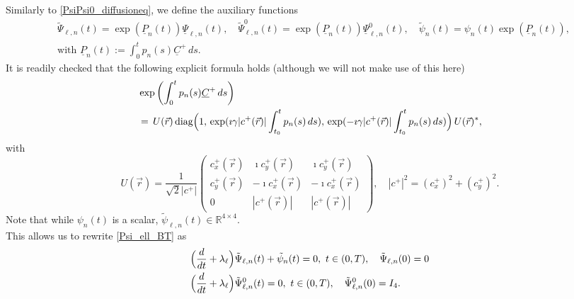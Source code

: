 \documentclass[12pt]{article}
\newcommand\ulC{\underline{C}}
\newcommand\ulPsi{\underline{\Psi}}
\begin{document}
Similarly to \eqref{PsiPsi0_diffusioneq}, we define the auxiliary functions 
\[
\begin{aligned}
&\tilde{\Psi}_{\ell,n}(t)=\exp(\underline{P}_n(t))\ulPsi_{\ell,n}(t), \quad
\tilde{\Psi}_{\ell,n}^0(t)=\exp(\underline{P}_n(t))\ulPsi_{\ell,n}^0(t),\quad
\tilde{\psi}_{n}(t)=\psi_n(t)\exp(\underline{P}_n(t)), \\
&\text{with }\underline{P}_n(t):=\int_0^tp_n(s)\ulC^+\, ds.
\end{aligned}
\]
It is readily checked that the following explicit formula holds (although we will not make use of this here) 
\begin{equation}\label{explicitsolution_BT_DII_A}
\begin{aligned}
&\exp\left(\int_0^tp_n(s)\ulC^+\, ds\right)\\
&=\,U(\vec r)\,\text{diag}\Bigl(1,\,\exp(\imath\gamma|c^+(\vec r)|\int_{t_0}^tp_n(s)\, ds),\,\exp(-\imath\gamma|c^+(\vec r)|\int_{t_0}^tp_n(s)\, ds)\Bigr)\,U(\vec r)^*,
\end{aligned}
\end{equation}
with 
\[
U(\vec r)= \frac{1}{\sqrt{2}|c^+|}\left(\begin{matrix}
c_x^+(\vec r)&\imath c_y^+(\vec r)&\imath c_y^+(\vec r)\\
c_y^+(\vec r)&-\imath c_x^+(\vec r)&-\imath c_x^+(\vec r)\\
0&|c^+(\vec r)|&|c^+(\vec r)|
\end{matrix}\right), \quad 
|c^+|^2=(c_x^+)^2+(c_y^+)^2.
\]
Note that while $\psi_n(t)$ is a scalar, $\tilde{\psi}_{\ell,n}(t)\in\mathbb{R}^{4\times4}$.
\\
This allows us to rewrite 
\eqref{Psi_ell_BT} as 
\begin{equation*}%
\begin{aligned}
&\Bigl(\frac{d}{dt}+\lambda_\ell\Bigr)\tilde{\Psi}_{\ell,n}(t)+\tilde{\psi}_n(t)=0, \ t\in(0,T),\quad \tilde{\Psi}_{\ell,n}(0)=0\\  
&\Bigl(\frac{d}{dt}+\lambda_\ell\Bigr)\tilde{\Psi}_{\ell,n}^0(t)=0, \ t\in(0,T),\quad \tilde{\Psi}_{\ell,n}^0(0)=I_4.
\end{aligned}
\end{equation*}
\end{document}
